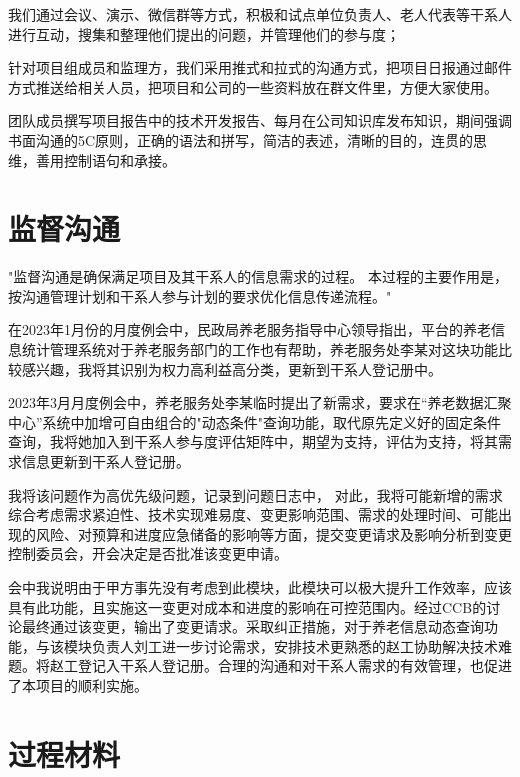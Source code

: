 \documentclass[UTF8]{../computerUniverse}
\begin{document}
我们通过会议、演示、微信群等方式，积极和试点单位负责人、老人代表等干系人进行互动，搜集和整理他们提出的问题，并管理他们的参与度；

针对项目组成员和监理方，我们采用推式和拉式的沟通方式，把项目日报通过邮件方式推送给相关人员，把项目和公司的一些资料放在群文件里，方便大家使用。

团队成员撰写项目报告中的技术开发报告、每月在公司知识库发布知识，期间强调书面沟通的5C原则，正确的语法和拼写，简洁的表述，清晰的目的，连贯的思维，善用控制语句和承接。

  
    

\section{监督沟通}
"监督沟通是确保满足项目及其干系人的信息需求的过程。
本过程的主要作用是，按沟通管理计划和干系人参与计划的要求优化信息传递流程。"


在2023年1月份的月度例会中，民政局养老服务指导中心领导指出，平台的养老信息统计管理系统对于养老服务部门的工作也有帮助，养老服务处李某对这块功能比较感兴趣，我将其识别为权力高利益高分类，更新到干系人登记册中。

2023年3月月度例会中，养老服务处李某临时提出了新需求，要求在“养老数据汇聚中心”系统中加增可自由组合的"动态条件"查询功能，取代原先定义好的固定条件查询，我将她加入到干系人参与度评估矩阵中，期望为支持，评估为支持，将其需求信息更新到干系人登记册。

我将该问题作为高优先级问题，记录到问题日志中，
对此，我将可能新增的需求综合考虑需求紧迫性、技术实现难易度、变更影响范围、需求的处理时间、可能出现的风险、对预算和进度应急储备的影响等方面，提交变更请求及影响分析到变更控制委员会，开会决定是否批准该变更申请。

会中我说明由于甲方事先没有考虑到此模块，此模块可以极大提升工作效率，应该具有此功能，且实施这一变更对成本和进度的影响在可控范围内。经过CCB的讨论最终通过该变更，输出了变更请求。采取纠正措施，对于养老信息动态查询功能，与该模块负责人刘工进一步讨论需求，安排技术更熟悉的赵工协助解决技术难题。将赵工登记入干系人登记册。合理的沟通和对干系人需求的有效管理，也促进了本项目的顺利实施。


\section{过程材料}


\end{document}
